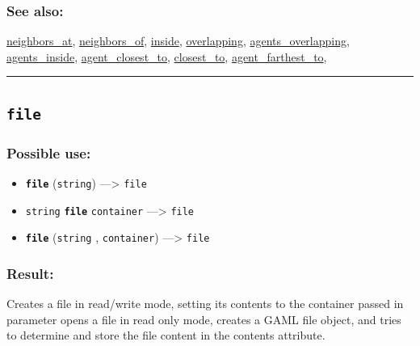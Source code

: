 \documentclass[]{book}
\providecommand{\tightlist}{%
  \setlength{\itemsep}{0pt}\setlength{\parskip}{0pt}}
\theoremstyle{definition}
\theoremstyle{definition}
\theoremstyle{definition}
\theoremstyle{remark}
\begin{document}
\subsubsection{See also:}\label{see-also-92}

\href{operators-n-to-r.html\#neighbors_at}{neighbors\_at},
\href{operators-n-to-r.html\#neighbors_of}{neighbors\_of},
\href{operators-i-to-m.html\#inside}{inside},
\href{operators-n-to-r.html\#overlapping}{overlapping},
\href{operators-a-to-a.html\#agents_overlapping}{agents\_overlapping},
\href{operators-a-to-a.html\#agents_inside}{agents\_inside},
\href{operators-a-to-a.html\#agent_closest_to}{agent\_closest\_to},
\href{operators-b-to-c.html\#closest_to}{closest\_to},
\href{operators-a-to-a.html\#agent_farthest_to}{agent\_farthest\_to},

\begin{center}\rule{0.5\linewidth}{\linethickness}\end{center}

\subsection{\texorpdfstring{\texttt{file}}{file}}\label{file}

\subsubsection{Possible use:}\label{possible-use-164}

\begin{itemize}
\tightlist
\item
  \textbf{\texttt{file}} (\texttt{string}) ---\textgreater{}
  \texttt{file}
\item
  \texttt{string} \textbf{\texttt{file}} \texttt{container}
  ---\textgreater{} \texttt{file}
\item
  \textbf{\texttt{file}} (\texttt{string} , \texttt{container})
  ---\textgreater{} \texttt{file}
\end{itemize}

\subsubsection{Result:}\label{result-158}

Creates a file in read/write mode, setting its contents to the container
passed in parameter opens a file in read only mode, creates a GAML file
object, and tries to determine and store the file content in the
contents attribute.
\end{document}
